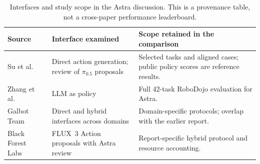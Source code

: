 \begin{table}[t]
\caption{Interfaces and study scope in the Astra discussion. This is a provenance table, not a cross-paper performance leaderboard.}
\label{tab:astra}
\small
\begin{tabularx}{\linewidth}{@{}>{\raggedright\arraybackslash}p{.19\linewidth}YY@{}}
\toprule
Source & Interface examined & Scope retained in the comparison \\
\midrule
Su et al.~\cite{su2026astra} & Direct action generation; review of $\pi_{0.5}$ proposals & Selected tasks and aligned cases; public policy scores are reference results. \\
\addlinespace
Zhang et al.~\cite{zhang2026unexpected} & LLM as policy & Full 42-task RoboDojo evaluation for Astra. \\
\addlinespace
Galbot Team~\cite{galbot2026astra} & Direct and hybrid interfaces across domains & Domain-specific protocols; overlap with the earlier report. \\
\addlinespace
Black Forest Labs~\cite{bfl2026flux3action} & FLUX~3 Action proposals with Astra review & Report-specific hybrid protocol and resource accounting. \\
\bottomrule
\end{tabularx}
\end{table}
